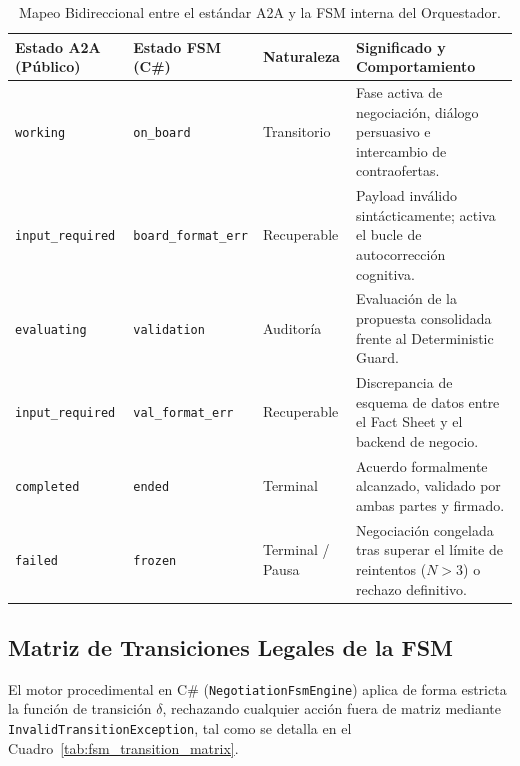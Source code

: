 \begin{table}[htbp]
\centering
\small
\begin{tabular}{lllp{6.5cm}}
\toprule
\textbf{Estado A2A (Público)} & \textbf{Estado FSM (C\#)} & \textbf{Naturaleza} & \textbf{Significado y Comportamiento} \\
\midrule
\texttt{working} & \texttt{on\_board} & Transitorio & Fase activa de negociación, diálogo persuasivo e intercambio de contraofertas. \\
\texttt{input\_required} & \texttt{board\_format\_err} & Recuperable & Payload inválido sintácticamente; activa el bucle de autocorrección cognitiva. \\
\texttt{evaluating} & \texttt{validation} & Auditoría & Evaluación de la propuesta consolidada frente al Deterministic Guard. \\
\texttt{input\_required} & \texttt{val\_format\_err} & Recuperable & Discrepancia de esquema de datos entre el Fact Sheet y el backend de negocio. \\
\texttt{completed} & \texttt{ended} & Terminal & Acuerdo formalmente alcanzado, validado por ambas partes y firmado. \\
\texttt{failed} & \texttt{frozen} & Terminal / Pausa & Negociación congelada tras superar el límite de reintentos ($N > 3$) o rechazo definitivo. \\
\bottomrule
\end{tabular}
\caption{Mapeo Bidireccional entre el estándar A2A y la FSM interna del Orquestador.}
\label{tab:fsm_mapping}
\end{table}

\subsection{Matriz de Transiciones Legales de la FSM}
El motor procedimental en C\# (\texttt{NegotiationFsmEngine}) aplica de forma estricta la función de transición $\delta$, rechazando cualquier acción fuera de matriz mediante \texttt{InvalidTransitionException}, tal como se detalla en el Cuadro~\ref{tab:fsm_transition_matrix}.

